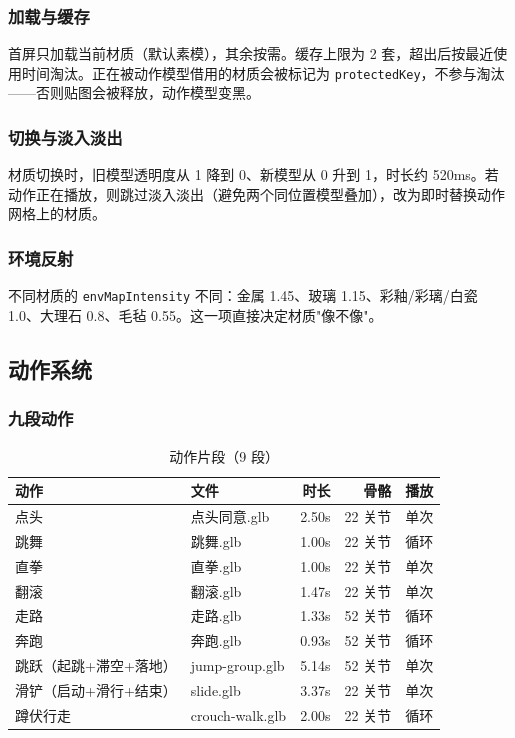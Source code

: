 \documentclass[UTF8,a4paper,11pt]{ctexart}
\begin{document}
\subsubsection{加载与缓存}
首屏只加载当前材质（默认素模），其余按需。缓存上限为 2 套，超出后按最近使用时间淘汰。正在被动作模型借用的材质会被标记为 \texttt{protectedKey}，不参与淘汰——否则贴图会被释放，动作模型变黑。

\subsubsection{切换与淡入淡出}
材质切换时，旧模型透明度从 1 降到 0、新模型从 0 升到 1，时长约 520ms。若动作正在播放，则跳过淡入淡出（避免两个同位置模型叠加），改为即时替换动作网格上的材质。

\subsubsection{环境反射}
不同材质的 \texttt{envMapIntensity} 不同：金属 1.45、玻璃 1.15、彩釉/彩璃/白瓷 1.0、大理石 0.8、毛毡 0.55。这一项直接决定材质"像不像"。

\subsection{动作系统}

\subsubsection{九段动作}
\begin{table}[H]
\centering
\small
\caption{动作片段（9 段）}
\begin{tabular}{@{}llrrl@{}}
\toprule
动作 & 文件 & 时长 & 骨骼 & 播放 \\
\midrule
点头 & 点头同意.glb & 2.50s & 22 关节 & 单次 \\
跳舞 & 跳舞.glb & 1.00s & 22 关节 & 循环 \\
直拳 & 直拳.glb & 1.00s & 22 关节 & 单次 \\
翻滚 & 翻滚.glb & 1.47s & 22 关节 & 单次 \\
走路 & 走路.glb & 1.33s & 52 关节 & 循环 \\
奔跑 & 奔跑.glb & 0.93s & 52 关节 & 循环 \\
跳跃（起跳+滞空+落地） & jump-group.glb & 5.14s & 52 关节 & 单次 \\
滑铲（启动+滑行+结束） & slide.glb & 3.37s & 22 关节 & 单次 \\
蹲伏行走 & crouch-walk.glb & 2.00s & 22 关节 & 循环 \\
\bottomrule
\end{tabular}
\end{table}
\end{document}
